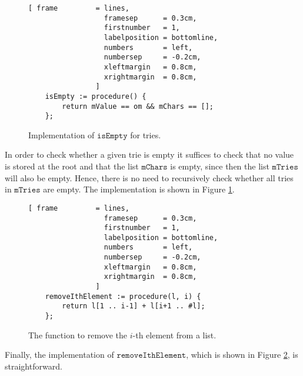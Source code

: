 \begin{figure}[!ht]
\centering
\begin{Verbatim}[ frame         = lines, 
                  framesep      = 0.3cm, 
                  firstnumber   = 1,
                  labelposition = bottomline,
                  numbers       = left,
                  numbersep     = -0.2cm,
                  xleftmargin   = 0.8cm,
                  xrightmargin  = 0.8cm,
                ]
    isEmpty := procedure() {
        return mValue == om && mChars == [];
    };
\end{Verbatim}
\vspace*{-0.3cm}
\caption{Implementation of $\mathtt{isEmpty}$ for tries.}
\label{fig:trie.stlx-isEmpty}
\end{figure}

In order to check whether a given trie is empty it suffices to check that no value is stored at the root
and that the list $\mathtt{mChars}$ is empty, since then the list $\mathtt{mTries}$ will also be empty.  Hence,
there is no need to recursively check whether all tries in $\mathtt{mTries}$ are empty.  
The implementation is shown in Figure \ref{fig:trie.stlx-isEmpty}.

\begin{figure}[!ht]
\centering
\begin{Verbatim}[ frame         = lines, 
                  framesep      = 0.3cm, 
                  firstnumber   = 1,
                  labelposition = bottomline,
                  numbers       = left,
                  numbersep     = -0.2cm,
                  xleftmargin   = 0.8cm,
                  xrightmargin  = 0.8cm,
                ]
    removeIthElement := procedure(l, i) {
        return l[1 .. i-1] + l[i+1 .. #l];
    };
\end{Verbatim}
\vspace*{-0.3cm}
\caption{The function to remove the $i$-th element from a list.}
\label{fig:trie.stlx-removeIthElement}
\end{figure}

Finally, the implementation of $\mathtt{removeIthElement}$, which is shown in Figure
\ref{fig:trie.stlx-removeIthElement}, is straightforward. 
\pagebreak

